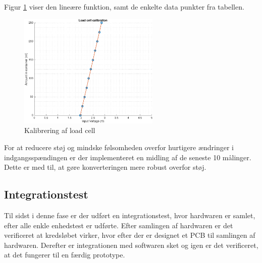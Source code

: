 Figur \ref{fig:loadcellcalib} viser den lineære funktion, samt de enkelte data punkter fra tabellen. 
\begin{figure}[H]
	\centering
	\includegraphics[width=0.6\textwidth]{billeder/software/calibration-crop.pdf}
	\caption{Kalibrering af load cell}
	\label{fig:loadcellcalib}
\end{figure}

For at reducere støj og mindske følsomheden overfor hurtigere ændringer i indgangsspændingen er der implementeret en midling af de seneste 10 målinger. Dette er med til, at gøre konverteringen mere robust overfor støj. 

\subsection{Integrationstest}
Til sidst i denne fase er der udført en integrationstest, hvor hardwaren er samlet, efter alle enkle enhedstest er udførte. Efter samlingen af hardwaren er det verificeret at kredsløbet virker, hvor efter der er designet et PCB til samlingen af hardwaren. Derefter er integrationen med softwaren sket og igen er det verificeret, at det fungerer til en færdig prototype. 

